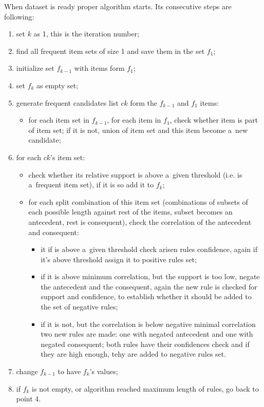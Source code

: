 \documentclass{article}
\begin{document}
	When dataset is ready proper algorithm starts. Its consecutive steps are following:
	\begin{enumerate}
		\item set $k$ as 1, this is the iteration number;
		\item find all frequent item sets of size 1 and save them in the set $f_{1}$;
		\item initialize set $f_{k-1}$ with items form $f_{1}$;
		\item set $f_{k}$ as empty set;
		\item generate frequent candidates list $ck$ form the $f_{k-1}$ and $f_{1}$ items:
		\begin{itemize}
			\item for each item set in $f_{k-1}$, for each item in $f_{1}$, check whether item is part of item set; if it is not, union of item set and this item become a~new candidate;
		\end{itemize}
		\item for each $ck$'s item set:
		\begin{itemize}
			\item check whether its relative support is above a~given threshold (i.e. is a~frequent item set), if it is so add it to $f_{k}$;
			\item for each split combination of this item set (combinations of subsets of each possible length against rest of the items, subset becomes an antecedent, rest is consequent), check the correlation of the antecedent and consequent:
			\begin{itemize}
				\item it if is above a~given threshold check arisen rules confidence, again if it's above threshold assign it to positive rules set;
				\item if it is above minimum correlation, but the support is too low, negate the antecedent and the consequent, again the new rule is checked for support and confidence, to establish whether it should be added to the set of negative rules;
				\item if it is not, but the correlation is below negative minimal correlation two new rules are made: one with negated antecedent and one with negated consequent; both rules have their confidences check and if they are high enough, tehy are added to negative rules set.
			\end{itemize}			
		\end{itemize}
		\item change $f_{k-1}$ to have $f_{k}$'s values;
		\item if $f_{k}$ is not empty, or algorithm reached maximum length of rules, go back to point 4.
	\end{enumerate}
	
\end{document}
